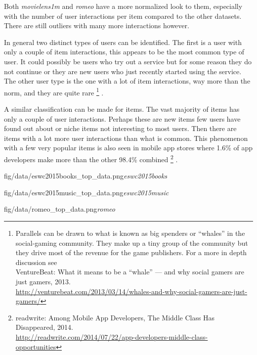 

Both \textit{movielens1m} and \textit{romeo} have a more normalized look to them, especially with the number of user interactions per item compared to the other datasets. There are still outliers with many more interactions however.

\FloatBarrier

In general two distinct types of users can be identified. The first is a user with only a couple of item interactions, this appears to be the most common type of user. It could possibly be users who try out a service but for some reason they do not continue or they are new users who just recently started using the service. The other user type is the one with a lot of item interactions, way more than the norm, and they are quite rare
\footnote{Parallels can be drawn to what is known as big spenders or ``whales'' in the social-gaming community. They make up a tiny group of the community but they drive most of the revenue for the game publishers. For a more in depth discussion see \\
VentureBeat: What it means to be a ``whale'' — and why social gamers are just gamers, 2013. \\
\url{http://venturebeat.com/2013/03/14/whales-and-why-social-gamers-are-just-gamers/} }
.

A similar classification can be made for items. The vast majority of items has only a couple of user interactions. Perhaps these are new items few users have found out about or niche items not interesting to most users. Then there are items with a lot more user interactions than what is common. This phenomenon with a few very popular items is also seen in mobile app stores where 1.6\% of app developers make more than the other 98.4\% combined
\footnote{
readwrite: Among Mobile App Developers, The Middle Class Has Disappeared, 2014. \\
\url{http://readwrite.com/2014/07/22/app-developers-middle-class-opportunities}
}
.

{fig/data/eswc2015books_top_data.png}{\textit{eswc2015books}}

{fig/data/eswc2015music_top_data.png}{\textit{eswc2015music}}

{fig/data/romeo_top_data.png}{\textit{romeo}}
